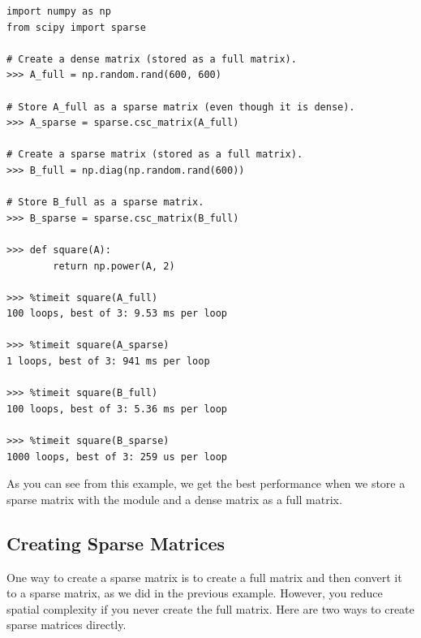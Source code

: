 \begin{lstlisting}
import numpy as np
from scipy import sparse

# Create a dense matrix (stored as a full matrix).
>>> A_full = np.random.rand(600, 600)

# Store A_full as a sparse matrix (even though it is dense).
>>> A_sparse = sparse.csc_matrix(A_full)

# Create a sparse matrix (stored as a full matrix).
>>> B_full = np.diag(np.random.rand(600))

# Store B_full as a sparse matrix.
>>> B_sparse = sparse.csc_matrix(B_full)

>>> def square(A):
        return np.power(A, 2)

>>> %timeit square(A_full)
100 loops, best of 3: 9.53 ms per loop

>>> %timeit square(A_sparse)
1 loops, best of 3: 941 ms per loop

>>> %timeit square(B_full)
100 loops, best of 3: 5.36 ms per loop

>>> %timeit square(B_sparse)
1000 loops, best of 3: 259 us per loop
\end{lstlisting}

As you can see from this example, we get the best performance when we store a sparse matrix with the  module and a dense matrix as a full matrix.

\subsection*{Creating Sparse Matrices}
One way to create a sparse matrix is to create a full matrix and then convert it to a sparse matrix, as we did in the previous example. 
However, you reduce spatial complexity if you never create the full matrix. 
Here are two ways to create sparse matrices directly.

